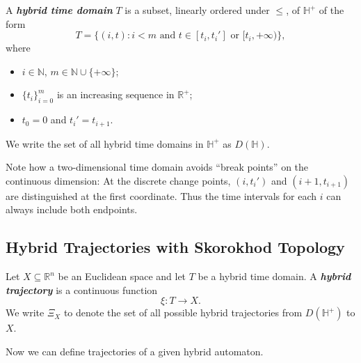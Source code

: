 \documentclass[envcountsect]{llncs}
\begin{document}
\begin{definition}
A {\bf\em hybrid time domain} $T$ is a subset, linearly ordered under $\leq$, of $\mathbb{H}^+$ of the form
$$T=\{(i, t): i<m \mbox{ and } t\in [t_i, t_i']\mbox{ or }[t_i, +\infty)\},$$ where%
\begin{itemize}
 \item $i\in \mathbb{N}$, $m\in \mathbb{N}\cup\{+\infty\}$; 
  \item $\{t_i\}_{i=0}^m$ is an increasing sequence in $\mathbb{R}^+$; 
 \item $t_0= 0$ and $t_i'=t_{i+1}$.
 \end{itemize} 
We write the set of all hybrid time domains in $\mathbb{H}^+$ as $D(\mathbb{H})$.
\end{definition}

\begin{remark}
Note how a two-dimensional time domain avoids ``break points'' on the continuous dimension: At the discrete change points, $(i,t_i')$ and $(i+1, t_{i+1})$ are distinguished at the first coordinate. Thus the time intervals for each $i$ can always include both endpoints. 
\end{remark}


\subsection{Hybrid Trajectories with Skorokhod Topology}

\begin{definition}
 Let $X\subseteq\mathbb{R}^n$ be an Euclidean space and let $T$ be a hybrid time domain. A {\bf\em hybrid trajectory} is a continuous function 
$$\xi: T \rightarrow X.$$
We write $\Xi_X$ to denote the set of all possible hybrid trajectories from $D(\mathbb{H}^+)$ to $X$. 
 \end{definition}

Now we can define trajectories of a given hybrid automaton. 
\end{document}
